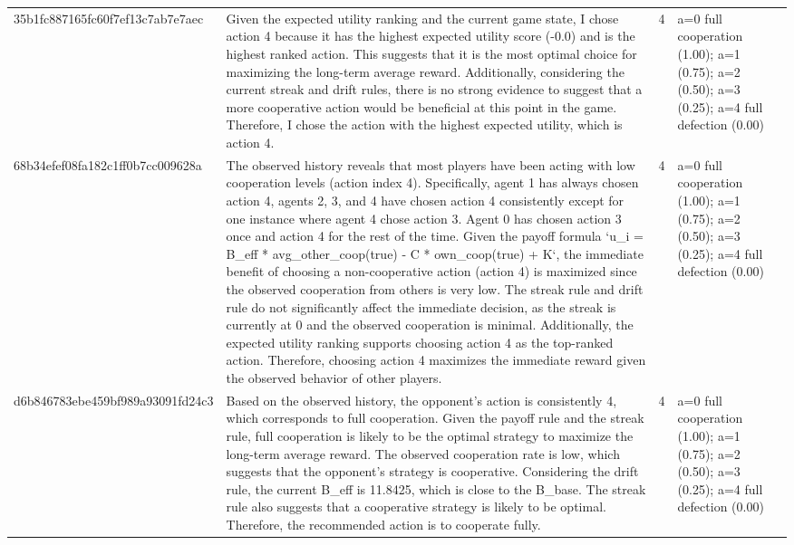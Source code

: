 \begin{tabular}{lp{8cm}ll l}
35b1fc887165fc60f7ef13c7ab7e7aec & Given the expected utility ranking and the current game state, I chose action 4 because it has the highest expected utility score (-0.0) and is the highest ranked action. This suggests that it is the most optimal choice for maximizing the long-term average reward. Additionally, considering the current streak and drift rules, there is no strong evidence to suggest that a more cooperative action would be beneficial at this point in the game. Therefore, I chose the action with the highest expected utility, which is action 4. & 4 & a=0 full cooperation (1.00); a=1 (0.75); a=2 (0.50); a=3 (0.25); a=4 full defection (0.00) &  \\
68b34efef08fa182c1ff0b7cc009628a & The observed history reveals that most players have been acting with low cooperation levels (action index 4). Specifically, agent 1 has always chosen action 4, agents 2, 3, and 4 have chosen action 4 consistently except for one instance where agent 4 chose action 3. Agent 0 has chosen action 3 once and action 4 for the rest of the time. Given the payoff formula `u\_i = B\_eff * avg\_other\_coop(true) - C * own\_coop(true) + K`, the immediate benefit of choosing a non-cooperative action (action 4) is maximized since the observed cooperation from others is very low. The streak rule and drift rule do not significantly affect the immediate decision, as the streak is currently at 0 and the observed cooperation is minimal. Additionally, the expected utility ranking supports choosing action 4 as the top-ranked action. Therefore, choosing action 4 maximizes the immediate reward given the observed behavior of other players. & 4 & a=0 full cooperation (1.00); a=1 (0.75); a=2 (0.50); a=3 (0.25); a=4 full defection (0.00) &  \\
d6b846783ebe459bf989a93091fd24c3 & Based on the observed history, the opponent's action is consistently 4, which corresponds to full cooperation. Given the payoff rule and the streak rule, full cooperation is likely to be the optimal strategy to maximize the long-term average reward. The observed cooperation rate is low, which suggests that the opponent's strategy is cooperative. Considering the drift rule, the current B\_eff is 11.8425, which is close to the B\_base. The streak rule also suggests that a cooperative strategy is likely to be optimal. Therefore, the recommended action is to cooperate fully. & 4 & a=0 full cooperation (1.00); a=1 (0.75); a=2 (0.50); a=3 (0.25); a=4 full defection (0.00) &  \\

\end{tabular}
